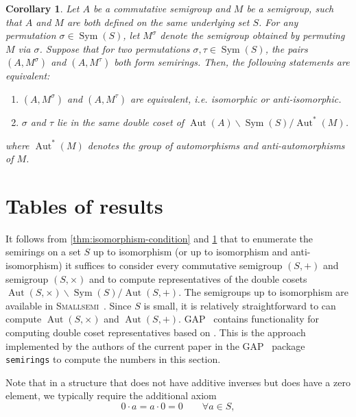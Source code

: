 \documentclass{article}
\theoremstyle{definition}
\theoremstyle{plain}
\newtheorem{cor}[defn]{Corollary}
\newcommand{\GAP}{\textsc{GAP}~\cite{GAP4}\xspace}
\newcommand{\Smallsemi}{\textsc{Smallsemi}~\cite{Smallsemi}\xspace}
\newcommand{\Sym}{\operatorname{Sym}}
\newcommand{\Aut}{\operatorname{Aut}}
\begin{document}

\begin{cor}
  \label{cor:equiv-condition}
  Let \(A\) be a commutative semigroup and \(M\) be a semigroup, such
  that \(A\) and \(M\) are both defined on the same underlying set
  \(S\). For any permutation \(\sigma \in \operatorname{Sym}(S)\),
  let \(M^\sigma\) denote the semigroup obtained by permuting \(M\)
  via \(\sigma\). Suppose that for two permutations \(\sigma,
  \tau\in\operatorname{Sym}(S)\), the pairs \((A,M^\sigma)\) and
  \((A,M^\tau)\) both form semirings. Then, the following statements
  are equivalent:
  \begin{enumerate}
    \item \((A, M^\sigma)\) and \((A, M^\tau)\) are equivalent, i.e.
      isomorphic or anti-isomorphic.
    \item \(\sigma\) and \(\tau\) lie in the same double coset of
      \(\operatorname{Aut}(A) \backslash \operatorname{Sym}(S) /
      \operatorname{Aut}^*(M)\).
  \end{enumerate}
  where \(\operatorname{Aut}^*(M)\) denotes the group of
  automorphisms and anti-automorphisms of \(M\).
\end{cor}

\section{Tables of results}

It follows from \cref{thm:isomorphism-condition} and
\cref{cor:equiv-condition} that to enumerate the
semirings on a set $S$ up to isomorphism (or up to isomorphism and
anti-isomorphism) it suffices to consider every
commutative semigroup $(S, +)$ and semigroup $(S, \times)$
and to compute representatives of the double cosets \(\Aut(S, \times)
\backslash \Sym(S) / \Aut(S, +)\). The semigroups up to isomorphism are
available in \Smallsemi.  Since $S$ is small, it is relatively
straightforward to can compute $\Aut(S, \times)$ and $\Aut(S, +)$.
\GAP contains functionality for computing double coset
representatives based on \cite{}. This is the approach implemented by the
authors of the current paper in the \GAP package \texttt{semirings} to compute
the numbers in this section.

Note that in a structure that does not have additive inverses but does have a zero element, we typically require the additional axiom
\begin{equation}
    \label{eq:rig-axiom}
    0\cdot a=a\cdot0=0\qquad\forall a\in S,
\end{equation}
\end{document}
